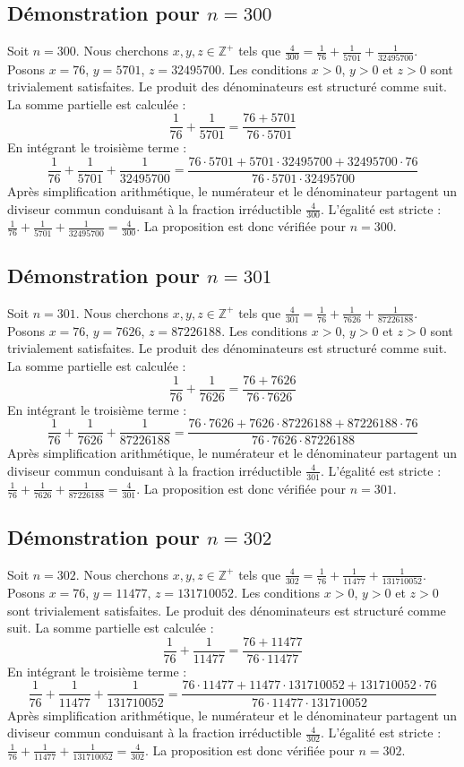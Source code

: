 \documentclass[11pt,a4paper]{article}
\begin{document}
\subsection{Démonstration pour $n = 300$}
Soit $n = 300$. Nous cherchons $x, y, z \in \mathbb{Z}^{+}$ tels que $\frac{4}{300} = \frac{1}{76} + \frac{1}{5701} + \frac{1}{32495700}$.
Posons $x = 76$, $y = 5701$, $z = 32495700$.
Les conditions $x > 0$, $y > 0$ et $z > 0$ sont trivialement satisfaites.
Le produit des dénominateurs est structuré comme suit. La somme partielle est calculée :
$$ \frac{1}{76} + \frac{1}{5701} = \frac{76+5701}{76 \cdot 5701} $$
En intégrant le troisième terme :
$$ \frac{1}{76} + \frac{1}{5701} + \frac{1}{32495700} = \frac{76 \cdot 5701 + 5701 \cdot 32495700 + 32495700 \cdot 76}{76 \cdot 5701 \cdot 32495700} $$
Après simplification arithmétique, le numérateur et le dénominateur partagent un diviseur commun conduisant à la fraction irréductible $\frac{4}{300}$.
L'égalité est stricte : $\frac{1}{76} + \frac{1}{5701} + \frac{1}{32495700} = \frac{4}{300}$.
La proposition est donc vérifiée pour $n = 300$.
\subsection{Démonstration pour $n = 301$}
Soit $n = 301$. Nous cherchons $x, y, z \in \mathbb{Z}^{+}$ tels que $\frac{4}{301} = \frac{1}{76} + \frac{1}{7626} + \frac{1}{87226188}$.
Posons $x = 76$, $y = 7626$, $z = 87226188$.
Les conditions $x > 0$, $y > 0$ et $z > 0$ sont trivialement satisfaites.
Le produit des dénominateurs est structuré comme suit. La somme partielle est calculée :
$$ \frac{1}{76} + \frac{1}{7626} = \frac{76+7626}{76 \cdot 7626} $$
En intégrant le troisième terme :
$$ \frac{1}{76} + \frac{1}{7626} + \frac{1}{87226188} = \frac{76 \cdot 7626 + 7626 \cdot 87226188 + 87226188 \cdot 76}{76 \cdot 7626 \cdot 87226188} $$
Après simplification arithmétique, le numérateur et le dénominateur partagent un diviseur commun conduisant à la fraction irréductible $\frac{4}{301}$.
L'égalité est stricte : $\frac{1}{76} + \frac{1}{7626} + \frac{1}{87226188} = \frac{4}{301}$.
La proposition est donc vérifiée pour $n = 301$.
\subsection{Démonstration pour $n = 302$}
Soit $n = 302$. Nous cherchons $x, y, z \in \mathbb{Z}^{+}$ tels que $\frac{4}{302} = \frac{1}{76} + \frac{1}{11477} + \frac{1}{131710052}$.
Posons $x = 76$, $y = 11477$, $z = 131710052$.
Les conditions $x > 0$, $y > 0$ et $z > 0$ sont trivialement satisfaites.
Le produit des dénominateurs est structuré comme suit. La somme partielle est calculée :
$$ \frac{1}{76} + \frac{1}{11477} = \frac{76+11477}{76 \cdot 11477} $$
En intégrant le troisième terme :
$$ \frac{1}{76} + \frac{1}{11477} + \frac{1}{131710052} = \frac{76 \cdot 11477 + 11477 \cdot 131710052 + 131710052 \cdot 76}{76 \cdot 11477 \cdot 131710052} $$
Après simplification arithmétique, le numérateur et le dénominateur partagent un diviseur commun conduisant à la fraction irréductible $\frac{4}{302}$.
L'égalité est stricte : $\frac{1}{76} + \frac{1}{11477} + \frac{1}{131710052} = \frac{4}{302}$.
La proposition est donc vérifiée pour $n = 302$.
\end{document}
